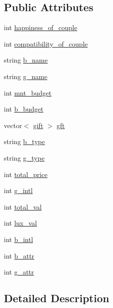 \subsection*{Public Attributes}
\begin{DoxyCompactItemize}
\item 
int \hyperlink{classcouple_a6f5f14c94d6a5a49714a5fff65f64cbf}{happiness\+\_\+of\+\_\+couple}
\item 
int \hyperlink{classcouple_a24e7fa900a50df33f3acd1a834a0a3bc}{compatibility\+\_\+of\+\_\+couple}
\item 
string \hyperlink{classcouple_a6b3c95b7bfa78735cf993324eced3655}{b\+\_\+name}
\item 
string \hyperlink{classcouple_a83504092da15c4e3944a98de5898831c}{g\+\_\+name}
\item 
int \hyperlink{classcouple_a1f8e27a6a1dfc8b9555c81d9a1d17741}{mnt\+\_\+budget}
\item 
int \hyperlink{classcouple_a2542852754ebeafb8c736b1e27ddda88}{b\+\_\+budget}
\item 
vector$<$ \hyperlink{classgift}{gift} $>$ \hyperlink{classcouple_ad96c4fee691c9554eef4d04b7c0256eb}{gft}
\item 
string \hyperlink{classcouple_a5488ccb8675f26a7130f2cdf63c445de}{b\+\_\+type}
\item 
string \hyperlink{classcouple_a591de2e782415686dd757b0b6a9f5058}{g\+\_\+type}
\item 
int \hyperlink{classcouple_a2f952dd595fe1b36047cede289a91f77}{total\+\_\+price}
\item 
int \hyperlink{classcouple_a838bdf34fd51d042238ce76588536ed2}{g\+\_\+intl}
\item 
int \hyperlink{classcouple_a3624df5a498ec1b985f06f53fd3853bf}{total\+\_\+val}
\item 
int \hyperlink{classcouple_acccc6fc5885997464ab7716eafa90331}{lux\+\_\+val}
\item 
int \hyperlink{classcouple_ad5b5aadb8e89829fdc5a8e7921f29cba}{b\+\_\+intl}
\item 
int \hyperlink{classcouple_a3d7d2ed58512c33ca7eacec507d958b1}{b\+\_\+attr}
\item 
int \hyperlink{classcouple_a75407f4baf081f692829f4277106eaca}{g\+\_\+attr}
\end{DoxyCompactItemize}


\subsection{Detailed Description}


